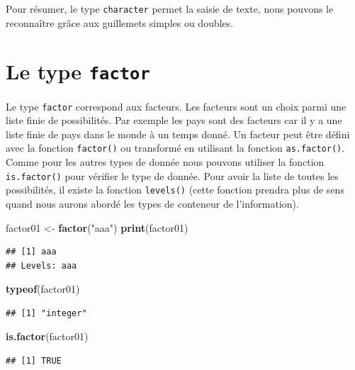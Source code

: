 \documentclass[]{book}
\newenvironment{Shaded}{\begin{snugshade}}{\end{snugshade}}
\newcommand{\KeywordTok}[1]{\textcolor[rgb]{0.13,0.29,0.53}{\textbf{#1}}}
\newcommand{\NormalTok}[1]{#1}
\newcommand{\StringTok}[1]{\textcolor[rgb]{0.31,0.60,0.02}{#1}}
\begin{document}
Pour résumer, le type \texttt{character} permet la saisie de texte, nous pouvons le reconnaître grâce aux guillemets simples ou doubles.

\hypertarget{le-type-factor}{%
\section{\texorpdfstring{Le type \texttt{factor}}{Le type factor}}\label{le-type-factor}}

Le type \texttt{factor} correspond aux facteurs. Les facteurs sont un choix parmi une liste finie de possibilités. Par exemple les pays sont des facteurs car il y a une liste finie de pays dans le monde à un temps donné. Un facteur peut être défini avec la fonction \texttt{factor()} ou transformé en utilisant la fonction \texttt{as.factor()}. Comme pour les autres types de donnée nous pouvons utiliser la fonction \texttt{is.factor()} pour vérifier le type de donnée. Pour avoir la liste de toutes les possibilités, il existe la fonction \texttt{levels()} (cette fonction prendra plus de sens quand nous aurons abordé les types de conteneur de l'information).

\begin{Shaded}
\begin{Highlighting}[]
\NormalTok{factor01 <-}\StringTok{ }\KeywordTok{factor}\NormalTok{(}\StringTok{"aaa"}\NormalTok{)}
\KeywordTok{print}\NormalTok{(factor01)}
\end{Highlighting}
\end{Shaded}

\begin{verbatim}
## [1] aaa
## Levels: aaa
\end{verbatim}

\begin{Shaded}
\begin{Highlighting}[]
\KeywordTok{typeof}\NormalTok{(factor01)}
\end{Highlighting}
\end{Shaded}

\begin{verbatim}
## [1] "integer"
\end{verbatim}

\begin{Shaded}
\begin{Highlighting}[]
\KeywordTok{is.factor}\NormalTok{(factor01)}
\end{Highlighting}
\end{Shaded}

\begin{verbatim}
## [1] TRUE
\end{verbatim}
\end{document}
